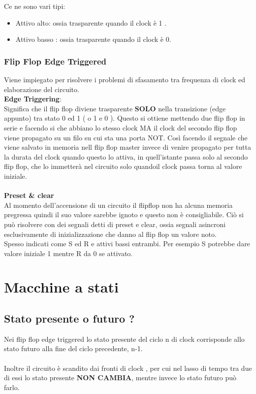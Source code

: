 \documentclass[a4paper]{book}
\begin{document}
Ce ne sono vari tipi:

\begin{itemize}
\item{Attivo alto}: ossia trasparente quando il clock è 1 .
\item{Attivo basso} : ossia trasparente quando il clock è 0.
\end{itemize}



\subsubsection{Flip Flop Edge Triggered} 

Viene impiegato per risolvere i problemi di sfasamento tra frequenza di clock ed elaborazione del circuito.\vspace{\baselineskip}\\
\textbf{Edge Triggering}:\\
Significa che il flip flop diviene trasparente \textbf{SOLO} nella transizione (edge appunto) tra stato 0 ed 1 ( o 1 e 0 ).
Questo si ottiene mettendo due flip flop in serie e facendo si che abbiano lo stesso clock MA il clock del secondo flip flop viene propagato su un filo su cui sta una porta NOT.
Così facendo il segnale che viene salvato in memoria nell flip flop master invece di venire propagato per tutta la durata del clock quando questo lo attiva, in quell'istante passa solo al secondo flip flop, che lo immetterà nel circuito solo quandoil clock passa torna al valore iniziale.\\ \\
\textbf{Preset \& clear}\\
Al momento dell'accensione di un circuito il flipflop non ha alcuna memoria pregressa quindi il suo valore sarebbe ignoto e questo non è consigliabile.
Ciò si può risolvere con dei segnali detti di preset e clear, ossia segnali asincroni esclusivamente di inizializzazione che danno al flip flop un valore noto.\\
Spesso indicati come S ed R e attivi bassi entrambi.
Per esempio S potrebbe dare valore iniziale 1 mentre R da 0 se attivato.


\section{Macchine a stati}

\subsection{Stato presente o futuro ?}
Nei flip flop edge triggered lo stato presente del ciclo n di clock corrisponde allo stato futuro alla fine del ciclo precedente, n-1.\\ \\
Inoltre il circuito è scandito dai fronti di clock , per cui nel lasso di tempo tra due di essi lo stato presente \textbf{NON CAMBIA}, mentre invece lo stato futuro può farlo.
\end{document}

